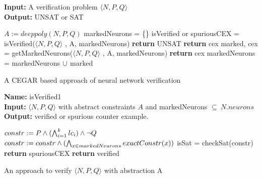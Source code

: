 \begin{algorithm}[t]
  \textbf{Input: } A verification problem $\langle N,P,Q \rangle$ \\
  \textbf{Output: } UNSAT or SAT
  \begin{algorithmic}[1]
    \State $A := deeppoly(N,P,Q)$
    \State markedNeurons = \{\}
      \State isVerified or spuriousCEX = isVerified($\langle N,P,Q \rangle$ , A, markedNeurons)
        \State \textbf{return} UNSAT
      \Else
          \State \textbf{return} cex
        \Else
          \State marked, cex = getMarkedNeurons($\langle N,P,Q \rangle$ , A, markedNeurons)
            \State \textbf{return} cex
          \EndIf
          \State markedNeurons = markedNeurons ${\cup}$ marked
        \EndIf
      \EndIf
    \EndWhile
  \end{algorithmic}
  \caption{A CEGAR based approach of neural network verification}
  \label{algo:main}
\end{algorithm}

\begin{algorithm}[t]
  \textbf{Name: } isVerified1 \\
  \textbf{Input: } $\langle N,P,Q \rangle$ with abstract constraints $A$ and markedNeurons $\subseteq ~ N.neurons$ \\
  \textbf{Output: } verified or spurious counter example. 
  \begin{algorithmic}[1]
    \State $constr := P \land (\bigwedge_{i=1}^k lc_i)\land \neg Q$
    \State $constr := constr \land (\bigwedge_{x \in markedNeurons} exactConstr(x))$
    \State isSat = checkSat(constr)
      \State \textbf{return} spuriousCEX
    \Else
      \State \textbf{return} verified
    \EndIf
  \end{algorithmic}
  \caption{An approach to verify $\langle N,P,Q \rangle$ with abstraction A}
  \label{algo:verif1}
\end{algorithm}

